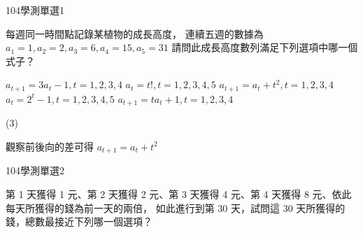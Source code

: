 \begin{QUESTIONS}
    \begin{QUESTION}
        \begin{ExamInfo}{104}{學測}{單選}{1}
        \end{ExamInfo}
        \begin{ExamAnsRateInfo}{88}{99}{98}{67}
        \end{ExamAnsRateInfo}
        \begin{QBODY}
		每週同一時間點記錄某植物的成長高度， 連續五週的數據為
			${{a}_{1}}=1, {{a}_{2}}=2, {{a}_{3}}=6,{{a}_{4}}=15, {{a}_{5}}=31$
			請問此成長高度數列滿足下列選項中哪一個式子？
			\begin{QOPS}
				\QOP ${{a}_{t+1}}=3{{a}_{t}}-1,t=1,2,3,4$
				\QOP ${{a}_{t}}=t!,t=1,2,3,4,5$
				\QOP ${{a}_{t+1}}={{a}_{t}}+{{t}^{2}},t=1,2,3,4$
				\QOP ${{a}_{t}}={{2}^{t}}-1,t=1,2,3,4,5$
				\QOP ${{a}_{t+1}}=t{{a}_{t}}+1,t=1,2,3,4$
			\end{QOPS}
        \end{QBODY}
        \begin{QFROMS}
        \end{QFROMS}
        \begin{QTAGS}\end{QTAGS}
        \begin{QANS}
            (3)
        \end{QANS}
        \begin{QSOLLIST}
			\begin{QSOL}
				觀察前後向的差可得 ${{a}_{t+1}}={{a}_{t}}+{{t}^{2}}$
			\end{QSOL}
        \end{QSOLLIST}
        \begin{QEMPTYSPACE}
        \end{QEMPTYSPACE}
    \end{QUESTION}
    \begin{QUESTION}
        \begin{ExamInfo}{104}{學測}{單選}{2}
        \end{ExamInfo}
        \begin{ExamAnsRateInfo}{68}{88}{72}{44}
        \end{ExamAnsRateInfo}
        \begin{QBODY}
		第 1 天獲得 1 元、第 2 天獲得 2 元、第 3 天獲得 4 元、第 4 天獲得 8 元、依此每天所獲得的錢為前一天的兩倍， 如此進行到第 30 天，試問這 30 天所獲得的錢，總數最接近下列哪一個選項？

\end{QBODY}
\end{QUESTION}
\end{QUESTIONS}
